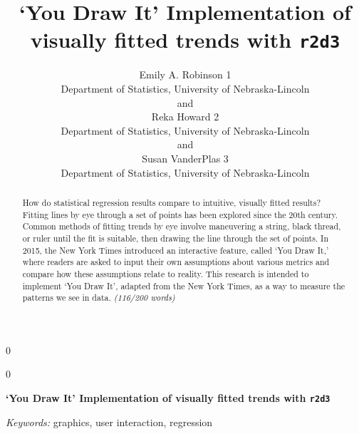 \documentclass[12pt]{article}
\newcommand{\blind}{0}
\begin{document}
\def\spacingset#1{\renewcommand{\baselinestretch}%
{#1}\small\normalsize} \spacingset{1}



\blind
{
  \title{\bf `You Draw It' Implementation of visually fitted trends with
\texttt{r2d3}}

  \author{
        Emily A. Robinson 1 \\
    Department of Statistics, University of Nebraska-Lincoln\\
     and \\     Reka Howard 2 \\
    Department of Statistics, University of Nebraska-Lincoln\\
     and \\     Susan VanderPlas 3 \\
    Department of Statistics, University of Nebraska-Lincoln\\
      }
  \maketitle
} \fi

\blind
{
  \bigskip
  \bigskip
  \bigskip
  \begin{center}
    {\LARGE\bf `You Draw It' Implementation of visually fitted trends
with \texttt{r2d3}}
  \end{center}
  \medskip
} \fi

\bigskip
\begin{abstract}
How do statistical regression results compare to intuitive, visually
fitted results? Fitting lines by eye through a set of points has been
explored since the 20th century. Common methods of fitting trends by eye
involve maneuvering a string, black thread, or ruler until the fit is
suitable, then drawing the line through the set of points. In 2015, the
New York Times introduced an interactive feature, called `You Draw It,'
where readers are asked to input their own assumptions about various
metrics and compare how these assumptions relate to reality. This
research is intended to implement `You Draw It', adapted from the New
York Times, as a way to measure the patterns we see in data.
\emph{(116/200 words)}
\end{abstract}

\noindent%
{\it Keywords:} graphics, user interaction, regression
\vfill

\newpage
\spacingset{1.45} %
\end{document}
